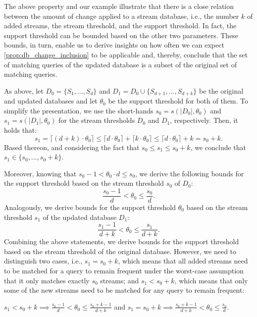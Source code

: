 The above property and our example illustrate that there is a close relation
between the amount of change applied to a stream database, i.e., the number
$k$ of added streams, the stream threshold, and the support threshold. In
fact, the support threshold can be bounded based on the other two
parameters. These bounds, in turn, enable us to derive insights on how
often we can expect \autoref{prop:db_change_inclusion} to be applicable and,
thereby, conclude that the set of matching queries of the updated database
is a subset of the original set of matching queries.

As above, let $D_0=\{S_1,\dots,S_d\}$ and $D_1=D_0 \cup \{S_{d+1}, \dots,
S_{d+k}\}$ be the original and updated databases and let $\theta_0$ be the
support
threshold for both of them. To simplify the presentation, we use the
short-hands $s_0 = s(|D_0|,\theta_0)$ and $s_1=s(|D_1|,\theta_0)$ for the
stream thresholds $D_0$ and $D_1$, respectively.
Then, it holds that:
$$
s_1 = \lceil (d+k) \cdot \theta_0 \rceil \leq \lceil d \cdot \theta_0 \rceil
+ \lceil k \cdot \theta_0 \rceil \leq \lceil d \cdot \theta_0 \rceil + k =
s_0 + k.
$$
Based thereon, and considering the fact
that $s_0 \leq s_1 \leq s_0+k$, we conclude that $s_1 \in \{s_0,\dots, s_0
+k\}$.

Moreover, knowing that $s_0-1 < \theta_0 \cdot d \leq s_0$, we derive the
following bounds for the support threshold based on the stream threshold
$s_0$ of $D_0$:
$$
\frac{s_0-1}{d} < \theta_0 \leq \frac{s_0}{d}.
$$
Analogously, we derive bounds for the support threshold $\theta_0$ based on
the stream threshold $s_1$ of the updated database $D_1$:
$$
\frac{s_1-1}{d+k} < \theta_0 \leq \frac{s_1}{d+k}.
$$
Combining the above statements, we derive bounds for the support threshold
based on the stream threshold of the original database. However,
we need to distinguish two cases, i.e., $s_1 = s_0+k$, which means that all
added streams need to be matched for a query to remain
frequent under the worst-case assumption that it only
matches exactly $s_0$ streams; and $s_1 <
s_0 +k$, which means that only some of the new streams
need to be matched for any query to remain frequent:
\begin{property}
\label{prop:db_change_bounds}
$s_1 < s_0 +k \implies \frac{s_0-1}{d} < \theta_0 \leq \frac{s_0+k-1}{d+k}$
and $s_1 = s_0+ k \implies \frac{s_0+k-1}{d+k} < \theta_0 \leq
\frac{s_0}{d}.$
\end{property}

